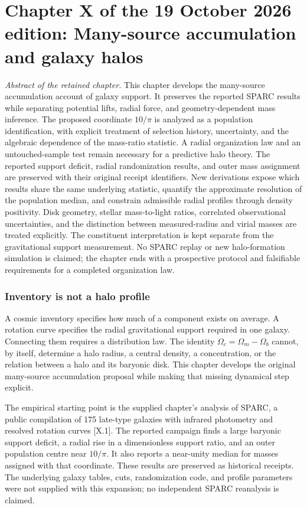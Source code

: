 

\part*{Chapter X of the 19 October 2026 edition: Many-source accumulation and galaxy halos}
\noindent\textit{Abstract of the retained chapter.} This chapter develops the many-source accumulation account of galaxy support. It preserves the reported SPARC results while separating potential lifts, radial force, and geometry-dependent mass inference. The proposed coordinate $10/\pi$ is analyzed as a population identification, with explicit treatment of selection history, uncertainty, and the algebraic dependence of the mass-ratio statistic. A radial organization law and an untouched-sample test remain necessary for a predictive halo theory. The reported support deficit, radial randomization results, and outer mass assignment are preserved with their original receipt identifiers. New derivations expose which results share the same underlying statistic, quantify the approximate resolution of the population median, and constrain admissible radial profiles through density positivity. Disk geometry, stellar mass-to-light ratios, correlated observational uncertainties, and the distinction between measured-radius and virial masses are treated explicitly. The constituent interpretation is kept separate from the gravitational support measurement. No SPARC replay or new halo-formation simulation is claimed; the chapter ends with a prospective protocol and falsifiable requirements for a completed organization law.

\section{Inventory is not a halo profile}

A cosmic inventory specifies how much of a component exists on average. A rotation curve specifies the radial gravitational support required in one galaxy. Connecting them requires a distribution law. The identity $\Omega_c=\Omega_m-\Omega_b$ cannot, by itself, determine a halo radius, a central density, a concentration, or the relation between a halo and its baryonic disk. This chapter develops the original many-source accumulation proposal while making that missing dynamical step explicit.

The empirical starting point is the supplied chapter's analysis of SPARC, a public compilation of 175 late-type galaxies with infrared photometry and resolved rotation curves [X.1]. The reported campaign finds a large baryonic support deficit, a radial rise in a dimensionless support ratio, and an outer population centre near $10/\pi$. It also reports a near-unity median for masses assigned with that coordinate. These results are preserved as historical receipts. The underlying galaxy tables, cuts, randomization code, and profile parameters were not supplied with this expansion; no independent SPARC reanalysis is claimed.

